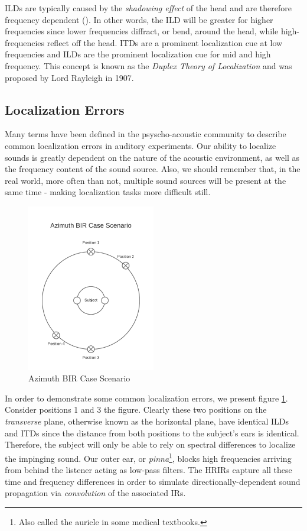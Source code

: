 ILDs are typically caused by the \textit{shadowing effect} of the head and are therefore frequency dependent (\cite{cuevas20193d}). In other words, the ILD will be greater for higher frequencies since lower frequencies diffract, or bend, around the head, while high-frequencies reflect off the head. ITDs are a prominent localization cue at low frequencies and ILDs are the prominent localization cue for mid and high frequency. This concept is known as the \textit{Duplex Theory of Localization} and was proposed by Lord Rayleigh in 1907. 

\subsection{Localization Errors}

Many terms have been defined in the psyscho-acoustic community to describe common localization errors in auditory experiments. Our ability to localize sounds is greatly dependent on the nature of the acoustic environment, as well as the frequency content of the sound source. Also, we should remember that, in the real world, more often than not, multiple sound sources will be present at the same time - making localization tasks more difficult still.

\begin{figure}[ht!]%
\centering
\includegraphics[width=0.5\textwidth]{img/azimuth-bir.png}
\caption{Azimuth BIR Case Scenario}
\label{fig:azimuth-bir}
\end{figure}

In order to demonstrate some common localization errors, we present figure \ref{fig:azimuth-bir}. Consider positions 1 and 3 the figure. Clearly these two positions on the \textit{transverse} plane, otherwise known as the horizontal plane, have identical ILDs and ITDs since the distance from both positions to the subject's ears is identical. Therefore, the subject will only be able to rely on spectral differences to localize the impinging sound. Our outer ear, or \textit{pinna}\footnote{Also called the auricle in some medical textbooks.}, blocks high frequencies arriving from behind the listener acting as low-pass filters. The HRIRs capture all these time and frequency differences in order to simulate directionally-dependent sound propagation via \textit{convolution} of the associated IRs. 

